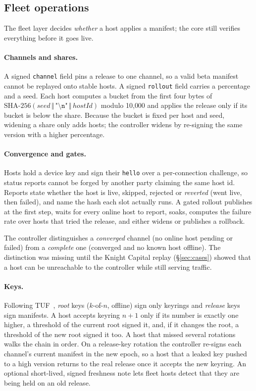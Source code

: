 \documentclass[10pt,twocolumn]{article}
\newcommand{\code}[1]{\texttt{#1}}
\begin{document}
\subsection{Fleet operations}

The fleet layer decides \emph{whether} a host applies a manifest; the core still verifies
everything before it goes live.

\paragraph{Channels and shares.} A signed \code{channel} field pins a release to one channel, so
a valid beta manifest cannot be replayed onto stable hosts. A signed \code{rollout} field carries
a percentage and a seed. Each host computes a bucket from the first four bytes of
$\mathrm{SHA\mbox{-}256}(\mathit{seed}\,\Vert\,\texttt{"\textbackslash n"}\,\Vert\,\mathit{hostId})$
modulo 10{,}000 and applies the release only if its bucket is below the share. Because the bucket
is fixed per host and seed, widening a share only adds hosts; the controller widens by re-signing
the same version with a higher percentage.

\paragraph{Convergence and gates.} Hosts hold a device key and sign their \code{hello} over a
per-connection challenge, so status reports cannot be forged by another party claiming the same
host id. Reports state whether the host is live, skipped, rejected or \emph{reverted} (went live,
then failed), and name the hash each slot actually runs. A gated rollout publishes at the first
step, waits for every online host to report, soaks, computes the failure rate over hosts that
tried the release, and either widens or publishes a rollback.

The controller distinguishes a \emph{converged} channel (no online host pending or failed) from a
\emph{complete} one (converged and no known host offline). The distinction was missing until the
Knight Capital replay (\S\ref{sec:cases}) showed that a host can be unreachable to the controller
while still serving traffic.

\paragraph{Keys.}
\label{sec:keys}
Following TUF~\cite{samuel2010tuf}, \emph{root} keys ($k$-of-$n$, offline) sign only keyrings and
\emph{release} keys sign manifests. A host accepts keyring $n{+}1$ only if its number is exactly
one higher, a threshold of the current root signed it, and, if it changes the root, a threshold of
the new root signed it too. A host that missed several rotations walks the chain in order. On a
release-key rotation the controller re-signs each channel's current manifest in the new epoch, so
a host that a leaked key pushed to a high version returns to the real release once it accepts the
new keyring. An optional short-lived, signed freshness note lets fleet hosts detect that they are
being held on an old release.
\end{document}
